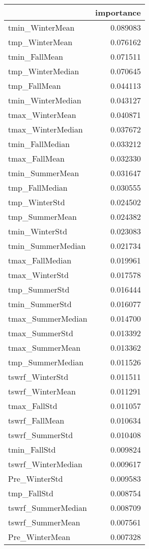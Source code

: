 \begin{tabular}{lr}
\toprule
 & importance \\
\midrule
tmin_WinterMean & 0.089083 \\
tmp_WinterMean & 0.076162 \\
tmin_FallMean & 0.071511 \\
tmp_WinterMedian & 0.070645 \\
tmp_FallMean & 0.044113 \\
tmin_WinterMedian & 0.043127 \\
tmax_WinterMean & 0.040871 \\
tmax_WinterMedian & 0.037672 \\
tmin_FallMedian & 0.033212 \\
tmax_FallMean & 0.032330 \\
tmin_SummerMean & 0.031647 \\
tmp_FallMedian & 0.030555 \\
tmp_WinterStd & 0.024502 \\
tmp_SummerMean & 0.024382 \\
tmin_WinterStd & 0.023083 \\
tmin_SummerMedian & 0.021734 \\
tmax_FallMedian & 0.019961 \\
tmax_WinterStd & 0.017578 \\
tmp_SummerStd & 0.016444 \\
tmin_SummerStd & 0.016077 \\
tmax_SummerMedian & 0.014700 \\
tmax_SummerStd & 0.013392 \\
tmax_SummerMean & 0.013362 \\
tmp_SummerMedian & 0.011526 \\
tswrf_WinterStd & 0.011511 \\
tswrf_WinterMean & 0.011291 \\
tmax_FallStd & 0.011057 \\
tswrf_FallMean & 0.010634 \\
tswrf_SummerStd & 0.010408 \\
tmin_FallStd & 0.009824 \\
tswrf_WinterMedian & 0.009617 \\
Pre_WinterStd & 0.009583 \\
tmp_FallStd & 0.008754 \\
tswrf_SummerMedian & 0.008709 \\
tswrf_SummerMean & 0.007561 \\
Pre_WinterMean & 0.007328 \\

\end{tabular}
